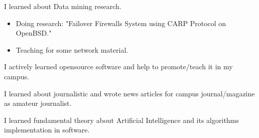 \documentclass[10pt, a4paper]{moderncv}
\begin{document}
{
\begin{scriptsize}
I learned about Data mining research.\\ 
\end{scriptsize}
}

{
\begin{itemize}
\item Doing research: "Failover Firewalls System using CARP Protocol on OpenBSD." 
\item Teaching for some network material.\\

\end{itemize}
}

{
\begin{scriptsize}
I actively learned opensource software and help to promote/teach it in my campus.\\
\end{scriptsize}
}

{
\begin{scriptsize}
I learned about journalistic and wrote news articles for campus journal/magazine as amateur journalist.\\
\end{scriptsize}
}

{
\begin{scriptsize}
I learned fundamental theory about Artificial Intelligence and its algorithms implementation in software.\\
\end{scriptsize}
}
\end{document}
